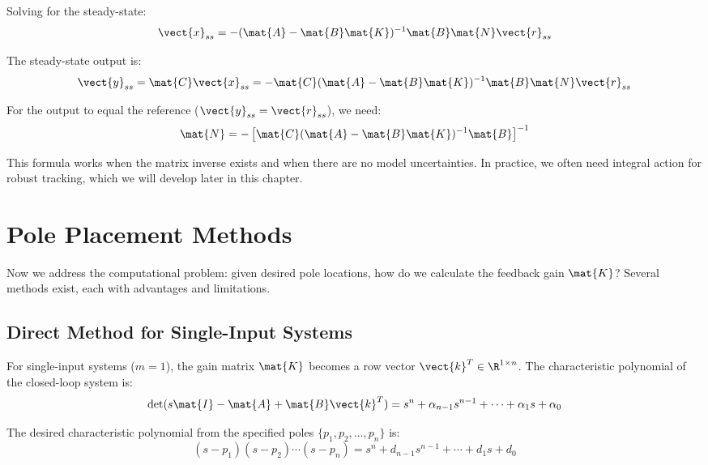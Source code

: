 Solving for the steady-state:
\begin{equation}
\vect{x}_{ss} = -(\mat{A} - \mat{B}\mat{K})^{-1}\mat{B}\mat{N}\vect{r}_{ss}
\end{equation}

The steady-state output is:
\begin{equation}
\vect{y}_{ss} = \mat{C}\vect{x}_{ss} = -\mat{C}(\mat{A} - \mat{B}\mat{K})^{-1}\mat{B}\mat{N}\vect{r}_{ss}
\end{equation}

For the output to equal the reference ($\vect{y}_{ss} = \vect{r}_{ss}$), we need:
\begin{equation}
\mat{N} = -\left[\mat{C}(\mat{A} - \mat{B}\mat{K})^{-1}\mat{B}\right]^{-1}
\label{eq:feedforward_gain}
\end{equation}

This formula works when the matrix inverse exists and when there are no model uncertainties. In practice, we often need integral action for robust tracking, which we will develop later in this chapter.

\section{Pole Placement Methods}
\label{sec:pole_placement_methods}

Now we address the computational problem: given desired pole locations, how do we calculate the feedback gain $\mat{K}$? Several methods exist, each with advantages and limitations.

\subsection{Direct Method for Single-Input Systems}

For single-input systems ($m = 1$), the gain matrix $\mat{K}$ becomes a row vector $\vect{k}^T \in \R^{1 \times n}$. The characteristic polynomial of the closed-loop system is:
\begin{equation}
\det(s\mat{I} - \mat{A} + \mat{B}\vect{k}^T) = s^n + \alpha_{n-1}s^{n-1} + \cdots + \alpha_1 s + \alpha_0
\end{equation}

The desired characteristic polynomial from the specified poles $\{p_1, p_2, \ldots, p_n\}$ is:
\begin{equation}
(s - p_1)(s - p_2)\cdots(s - p_n) = s^n + d_{n-1}s^{n-1} + \cdots + d_1 s + d_0
\end{equation}


